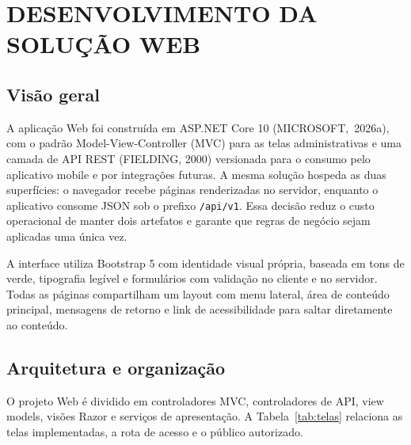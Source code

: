 \section{DESENVOLVIMENTO DA SOLUÇÃO WEB}

\subsection{Visão geral}

A aplicação Web foi construída em ASP.NET Core 10 \mbox{(MICROSOFT, 2026a)}, com o padrão
Model-View-Controller (MVC) para as telas administrativas e uma camada de API
REST (FIELDING, 2000) versionada para o consumo pelo aplicativo mobile e por
integrações futuras.
A mesma solução hospeda as duas superfícies: o navegador recebe páginas
renderizadas no servidor, enquanto o aplicativo consome JSON sob o prefixo
\texttt{/api/v1}. Essa decisão reduz o custo operacional de manter dois
artefatos e garante que regras de negócio sejam aplicadas uma única vez.

A interface utiliza Bootstrap 5 com identidade visual própria, baseada em tons de
verde, tipografia legível e formulários com validação no cliente e no servidor.
Todas as páginas compartilham um layout com menu lateral, área de conteúdo
principal, mensagens de retorno e link de acessibilidade para saltar diretamente
ao conteúdo.

\subsection{Arquitetura e organização}

O projeto Web é dividido em controladores MVC, controladores de API, view models,
visões Razor e serviços de apresentação. A Tabela~\ref{tab:telas} relaciona as
telas implementadas, a rota de acesso e o público autorizado.

